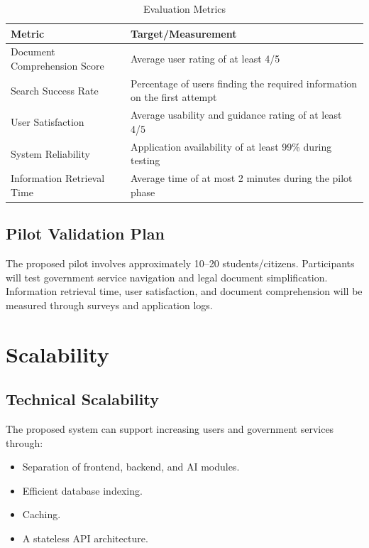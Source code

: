 \documentclass[12pt,a4paper]{report}
\begin{document}
\begin{table}[H]
\centering
\caption{Evaluation Metrics}
\begin{tabular}{p{5cm}p{7cm}}
\toprule
\textbf{Metric} & \textbf{Target/Measurement} \\
\midrule
Document Comprehension Score & Average user rating of at least 4/5 \\
Search Success Rate & Percentage of users finding the required information on the first attempt \\
User Satisfaction & Average usability and guidance rating of at least 4/5 \\
System Reliability & Application availability of at least 99\% during testing \\
Information Retrieval Time & Average time of at most 2 minutes during the pilot phase \\
\bottomrule
\end{tabular}
\end{table}

\section{Pilot Validation Plan}

The proposed pilot involves approximately 10--20 students/citizens. Participants will test government service navigation and legal document simplification. Information retrieval time, user satisfaction, and document comprehension will be measured through surveys and application logs.

\chapter{Scalability}

\section{Technical Scalability}

The proposed system can support increasing users and government services through:

\begin{itemize}[leftmargin=*]
    \item Separation of frontend, backend, and AI modules.
    \item Efficient database indexing.
    \item Caching.
    \item A stateless API architecture.
\end{itemize}
\end{document}
